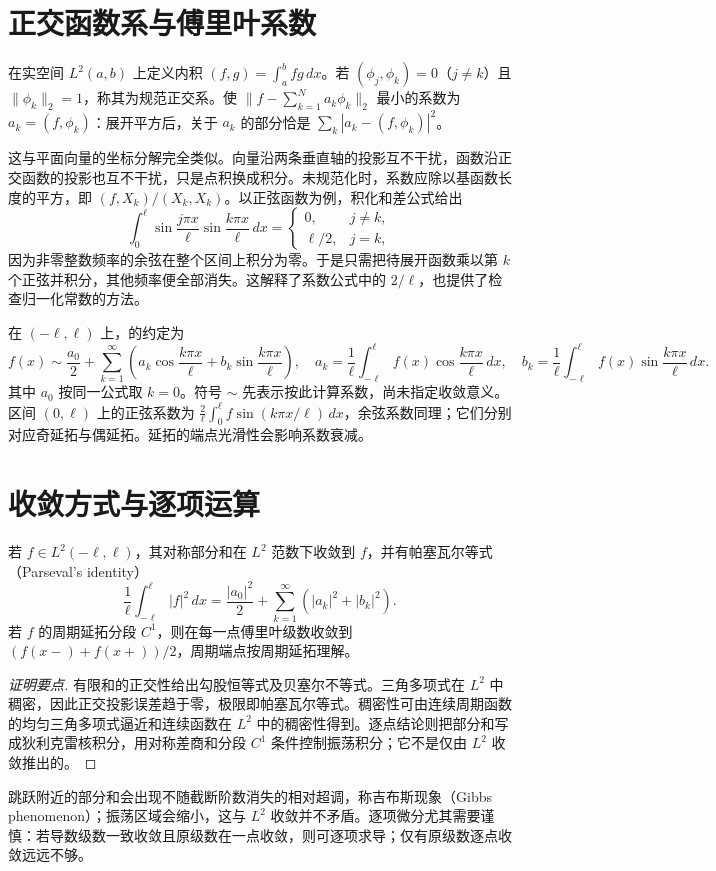 \documentclass[UTF8,12pt,a4paper,fontset=fandol]{ctexbook}
\begin{document}
\section{正交函数系与傅里叶系数}
在实空间 $L^2(a,b)$ 上定义内积 $(f,g)=\int_a^b fg\,dx$。若 $(\phi_j,\phi_k)=0$（$j\ne k$）且 $\|\phi_k\|_2=1$，称其为规范正交系。使 $\|f-\sum_{k=1}^N a_k\phi_k\|_2$ 最小的系数为 $a_k=(f,\phi_k)$：展开平方后，关于 $a_k$ 的部分恰是 $\sum_k|a_k-(f,\phi_k)|^2$。

这与平面向量的坐标分解完全类似。向量沿两条垂直轴的投影互不干扰，函数沿正交函数的投影也互不干扰，只是点积换成积分。未规范化时，系数应除以基函数长度的平方，即 $(f,X_k)/(X_k,X_k)$。以正弦函数为例，积化和差公式给出
\[
 \int_0^\ell\sin\frac{j\pi x}{\ell}\sin\frac{k\pi x}{\ell}\,dx
 =\begin{cases}0,&j\ne k,\\ \ell/2,&j=k,\end{cases}
\]
因为非零整数频率的余弦在整个区间上积分为零。于是只需把待展开函数乘以第 $k$ 个正弦并积分，其他频率便全部消失。这解释了系数公式中的 $2/\ell$，也提供了检查归一化常数的方法。

在 $(-\ell,\ell)$ 上，的约定为
\begin{equation}
 f(x)\sim\frac{a_0}{2}+\sum_{k=1}^\infty\left(a_k\cos\frac{k\pi x}{\ell}+b_k\sin\frac{k\pi x}{\ell}\right),
 \quad
 a_k=\frac1\ell\int_{-\ell}^\ell f(x)\cos\frac{k\pi x}{\ell}\,dx,
 \quad
 b_k=\frac1\ell\int_{-\ell}^\ell f(x)\sin\frac{k\pi x}{\ell}\,dx.
 \label{eq:fourier-series-coefficients}
\end{equation}
其中 $a_0$ 按同一公式取 $k=0$。符号 $\sim$ 先表示按此计算系数，尚未指定收敛意义。区间 $(0,\ell)$ 上的正弦系数为 $\frac2\ell\int_0^\ell f\sin(k\pi x/\ell)\,dx$，余弦系数同理；它们分别对应奇延拓与偶延拓。延拓的端点光滑性会影响系数衰减。

\section{收敛方式与逐项运算}
\begin{theorem}[傅里叶收敛的两种基本形式]
若 $f\in L^2(-\ell,\ell)$，其对称部分和在 $L^2$ 范数下收敛到 $f$，并有帕塞瓦尔等式（Parseval's identity）
\[
 \frac1\ell\int_{-\ell}^\ell |f|^2\,dx
 =\frac{|a_0|^2}{2}+\sum_{k=1}^\infty(|a_k|^2+|b_k|^2).
\]
若 $f$ 的周期延拓分段 $C^1$，则在每一点傅里叶级数收敛到 $(f(x-)+f(x+))/2$，周期端点按周期延拓理解。
\end{theorem}
\begin{proof}[证明要点]
有限和的正交性给出勾股恒等式及贝塞尔不等式。三角多项式在 $L^2$ 中稠密，因此正交投影误差趋于零，极限即帕塞瓦尔等式。稠密性可由连续周期函数的均匀三角多项式逼近和连续函数在 $L^2$ 中的稠密性得到。逐点结论则把部分和写成狄利克雷核积分，用对称差商和分段 $C^1$ 条件控制振荡积分；它不是仅由 $L^2$ 收敛推出的。
\end{proof}
跳跃附近的部分和会出现不随截断阶数消失的相对超调，称吉布斯现象（Gibbs phenomenon）；振荡区域会缩小，这与 $L^2$ 收敛并不矛盾。逐项微分尤其需要谨慎：若导数级数一致收敛且原级数在一点收敛，则可逐项求导；仅有原级数逐点收敛远远不够。
\end{document}
